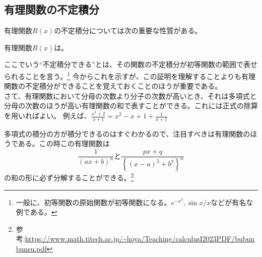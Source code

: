 \documentclass[a4j,dvipdfmx]{jsarticle}
\begin{document}
            \subsection{有理関数の不定積分}
                有理関数$R(x)$の不定積分については次の重要な性質がある。
                \begin{screen}\centering
                    有理関数$R(x)$は。
                \end{screen}
                ここでいう``不定積分できる''とは、その関数の不定積分が初等関数の範囲で表せられることを言う。\footnote{一般に、初等関数の原始関数が初等関数になる。$e^{-x^2},\sin x/x$などが有名な例である。}
                今からこれを示すが、この証明を理解することよりも有理関数の不定積分ができることを覚えておくことのほうが重要である。\\

                さて、有理関数において分母の次数より分子の次数が高いとき、それは多項式と分母の次数のほうが高い有理関数の和で表すことができる。これには正式の除算を用いればよい。
                例えば、$\frac{x^3+2}{x+1}=x^2-x+1+\frac{1}{x+1}$
                
                多項式の積分の方が積分できるのはすぐわかるので、注目すべきは有理関数のほうである。この時この有理関数は
                \begin{equation}
                    \frac{1}{(ax+b)^n}\text{と}\frac{px+q}{\left\{(x-a)^2+b^2\right\}^n}
                \end{equation}
                の和の形に必ず分解することができる。\footnote{参考:\url{https://www.math.titech.ac.jp/~hoya/Teaching/calculusI2023PDF/bubunbunsu.pdf}}
                
\end{document}
